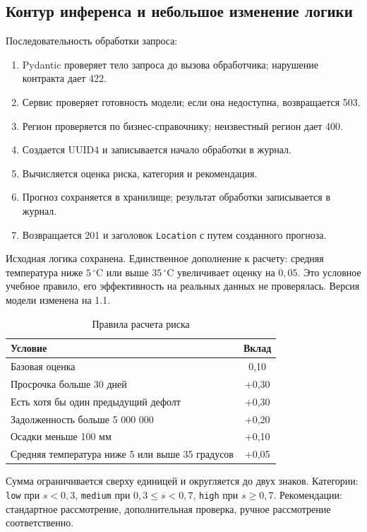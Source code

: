 \documentclass[12pt,a4paper]{article}
\begin{document}
\subsection{Контур инференса и небольшое изменение логики}
Последовательность обработки запроса:
\begin{enumerate}
\item Pydantic проверяет тело запроса до вызова обработчика; нарушение контракта дает 422.
\item Сервис проверяет готовность модели; если она недоступна, возвращается 503.
\item Регион проверяется по бизнес-справочнику; неизвестный регион дает 400.
\item Создается UUID4 и записывается начало обработки в журнал.
\item Вычисляется оценка риска, категория и рекомендация.
\item Прогноз сохраняется в хранилище; результат обработки записывается в журнал.
\item Возвращается 201 и заголовок \texttt{Location} с путем созданного прогноза.
\end{enumerate}
Исходная логика сохранена. Единственное дополнение к расчету: средняя температура ниже $5\,^{\circ}\mathrm{C}$ или выше $35\,^{\circ}\mathrm{C}$ увеличивает оценку на $0{,}05$. Это условное учебное правило, его эффективность на реальных данных не проверялась. Версия модели изменена на 1.1.
\begin{table}[H]
\centering\caption{Правила расчета риска}
\begin{tabularx}{\textwidth}{|X|c|}\hline
Условие & Вклад \\\hline
Базовая оценка & 0,10 \\\hline
Просрочка больше 30 дней & +0,30 \\\hline
Есть хотя бы один предыдущий дефолт & +0,30 \\\hline
Задолженность больше 5 000 000 & +0,20 \\\hline
Осадки меньше 100 мм & +0,10 \\\hline
Средняя температура ниже 5 или выше 35 градусов & +0,05 \\\hline
\end{tabularx}
\end{table}
Сумма ограничивается сверху единицей и округляется до двух знаков. Категории: \texttt{low} при $s<0{,}3$, \texttt{medium} при $0{,}3\leq s<0{,}7$, \texttt{high} при $s\geq0{,}7$. Рекомендации: стандартное рассмотрение, дополнительная проверка, ручное рассмотрение соответственно.
\end{document}
